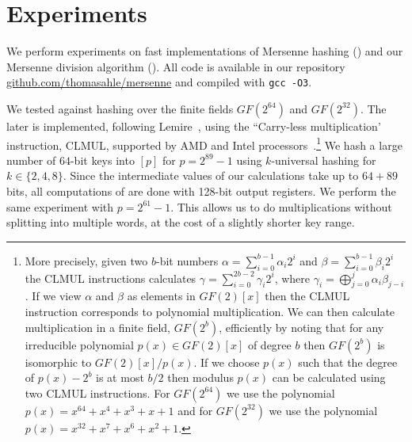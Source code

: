 \section{Experiments}\label{sec:experiments}
We perform experiments on fast implementations of Mersenne hashing () and our Mersenne division algorithm ().
All code is available in our repository\\\href{https://github.com/thomasahle/mersenne/}{github.com/thomasahle/mersenne} and compiled with \texttt{gcc -O3}.

We tested  against hashing over the finite fields $GF(2^{64})$ and $GF(2^{32})$.
The later is implemented, following Lemire~\cite{lemire2014strongly}, using the ``Carry-less multiplication' instruction, CLMUL, supported by AMD and Intel processors~\cite{GUERON2010549}.\footnote{
More precisely, given two $b$-bit numbers $\alpha = \sum_{i = 0}^{b - 1} \alpha_i 2^i$ and $\beta = \sum_{i = 0}^{b - 1} \beta_i 2^i$
the CLMUL instructions calculates $\gamma = \sum_{i = 0}^{2b - 2} \gamma_i 2^i$, where $\gamma_i = \bigoplus_{j = 0}^{j} \alpha_i \beta_{j - i}$.
If we view $\alpha$ and $\beta$ as elements in $GF(2)[x]$ then the CLMUL instruction corresponds to polynomial multiplication.
We can then calculate multiplication in a finite field, $GF(2^b)$, efficiently by noting that for any irreducible polynomial $p(x) \in GF(2)[x]$
of degree $b$ then $GF(2^b)$ is isomorphic to $GF(2)[x] / p(x)$. If we choose $p(x)$ such that the degree of $p(x) - 2^{b}$ is at
most $b/2$ then modulus $p(x)$ can be calculated using two CLMUL instructions.
For $GF(2^{64})$ we use the polynomial $p(x) = x^{64} + x^4 + x^3 + x + 1$ and for $GF(2^{32})$ we use the polynomial $p(x) = x^{32} + x^7 + x^6 + x^2 + 1$.
}
%
We hash a large number of $64$-bit keys into $[p]$ for $p=2^{89}-1$ using $k$-universal hashing for $k \in \{2, 4, 8\}$.
Since the intermediate values of our calculations take up to $64 + 89$ bits, all computations of  are done with 128-bit output registers.
We perform the same experiment with $p=2^{61}-1$.
This allows us to do multiplications without splitting into multiple words, at the cost of a slightly shorter key range.


